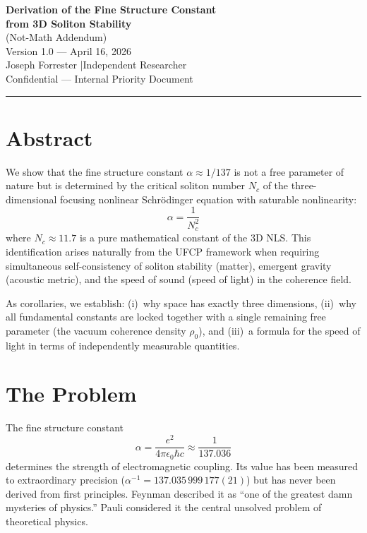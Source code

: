 \documentclass[11pt, a4paper]{article}
\begin{document}
\begin{center}
  {\LARGE \textbf{Derivation of the Fine Structure Constant}}\\[4pt]
  {\LARGE \textbf{from 3D Soliton Stability}}\\[6pt]
  {\large (Not-Math Addendum)}\\[8pt]
  {\color{nm-gray}\small Version 1.0 --- April 16, 2026}\\[4pt]
  {\color{nm-gray}\small Joseph Forrester \quad|\quad Independent Researcher}\\[4pt]
  {\color{nm-gray}\small Confidential --- Internal Priority Document}
\end{center}

\vspace{1em}
\hrule
\vspace{1em}

\section*{Abstract}

We show that the fine structure constant $\alpha \approx 1/137$
is not a free parameter of nature but is determined by the
critical soliton number $N_c$ of the three-dimensional
focusing nonlinear Schr\"odinger equation with saturable
nonlinearity:
\begin{equation}
  \alpha = \frac{1}{N_c^2}
\end{equation}
where $N_c \approx 11.7$ is a pure mathematical constant of
the 3D NLS. This identification arises naturally from the UFCP
framework when requiring simultaneous self-consistency of
soliton stability (matter), emergent gravity (acoustic metric),
and the speed of sound (speed of light) in the coherence field.

As corollaries, we establish: (i)~why space has exactly three
dimensions, (ii)~why all fundamental constants are locked
together with a single remaining free parameter (the vacuum
coherence density $\rho_0$), and (iii)~a formula for the speed
of light in terms of independently measurable quantities.

\tableofcontents

\section{The Problem}

The fine structure constant
\begin{equation}
  \alpha = \frac{e^2}{4\pi\epsilon_0\hbar c}
  \approx \frac{1}{137.036}
\end{equation}
determines the strength of electromagnetic coupling. Its value
has been measured to extraordinary precision
($\alpha^{-1} = 137.035\,999\,177(21)$) but has never been
derived from first principles. Feynman described it as ``one of
the greatest damn mysteries of physics.'' Pauli considered it
the central unsolved problem of theoretical physics.
\end{document}
